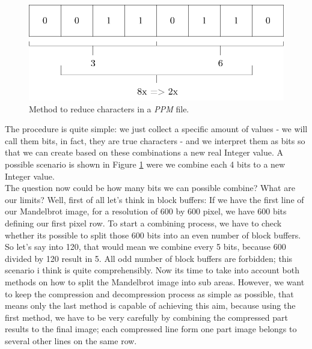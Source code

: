 \begin{figure}[htbp]
	\centerline{\includegraphics[width=0.75\linewidth]{images/compression-2.png}}
	\caption{ Method to reduce characters in a \textit{PPM} file. }
	\label{fig:ppmCompression}
\end{figure} 

\newpage

The procedure is quite simple: we just collect a specific amount of values - we will call them bits, in fact, they are true characters - and we interpret them as bits so that we can create based on these combinations a new real Integer value. A possible scenario is shown in Figure \ref{fig:ppmCompression} were we combine each 4 bits to a new Integer value.\\

\noindent The question now could be how many bits we can possible combine? What are our limits? Well, first of all let's think in block buffers: If we have the first line of our Mandelbrot image, for a resolution of 600 by 600 pixel, we have 600 bits defining our first pixel row. To start a combining process, we have to check whether its possible to split those 600 bits into an even number of block buffers. So let's say into 120, that would mean we combine every 5 bits, because 600 divided by 120 result in 5. All odd number of block buffers are forbidden; this scenario i think is quite comprehensibly. Now its time to take into account both methods on how to split the Mandelbrot image into sub areas. However, we want to keep the compression and decompression process as simple as possible, that means only the last method is capable of achieving this aim, because using the first method, we have to be very carefully by combining the compressed part results to the final image; each compressed line form one part image belongs to several other lines on the same row.

\begin{center} \label{graph:fileCompression}
\end{center}

